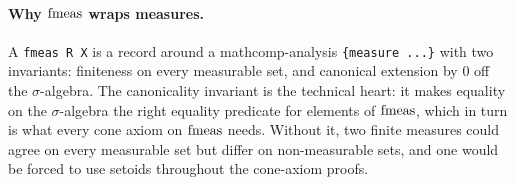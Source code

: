 \paragraph{Why \texorpdfstring{$\mathrm{fmeas}$}{fmeas} wraps measures.}
A \texttt{fmeas R X} is a record around a mathcomp-analysis
\texttt{\{measure ...\}} with two invariants: finiteness on every
measurable set, and canonical extension by $0$ off the
$\sigma$-algebra. The canonicality invariant is the technical heart:
it makes equality on the $\sigma$-algebra the right equality
predicate for elements of $\mathrm{fmeas}$, which in turn is what every cone
axiom on $\mathrm{fmeas}$ needs. Without it, two finite measures could agree
on every measurable set but differ on non-measurable sets, and one
would be forced to use setoids throughout the cone-axiom proofs.
